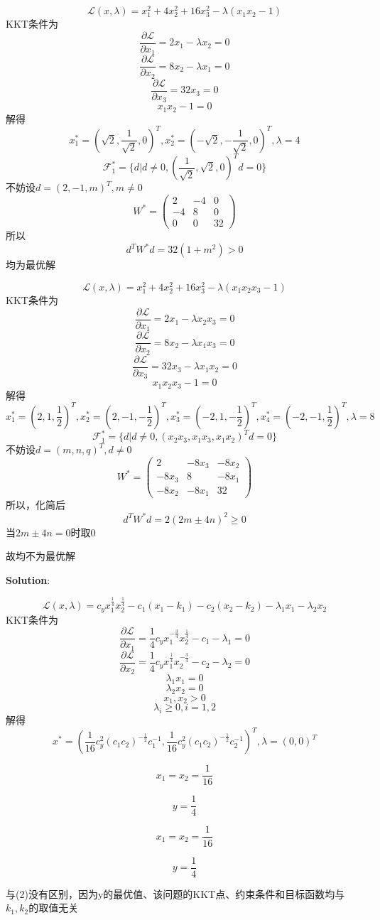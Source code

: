 \documentclass[a4 paper]{article}
\begin{document}

$$\mathcal{L}(x,\lambda) =x_1^2+4x_2^2+16x_3^2-\lambda(x_1 x_2-1)$$
KKT条件为
$$\frac{\partial \mathcal{L}}{\partial x_1}=2x_1-\lambda x_2=0$$
$$\frac{\partial \mathcal{L}}{\partial x_2}=8x_2-\lambda x_1=0$$
$$\frac{\partial \mathcal{L}}{\partial x_3}=32x_3=0$$
$$x_1x_2-1=0$$
解得
$$x_1^\ast=(\sqrt{2},\frac{1}{\sqrt{2}},0)^T,x_2^\ast=(-\sqrt{2},-\frac{1}{\sqrt{2}},0)^T,\lambda=4$$
$$\mathcal{F}_1^\ast=\{d|d\neq 0,(\frac{1}{\sqrt{2}},\sqrt{2},0)^Td=0\}$$
不妨设$d=(2,-1,m)^T,m\neq 0$
$$W^\ast=\begin{pmatrix}2& -4 & 0\\-4& 8 & 0\\0&0&32\end{pmatrix}$$
所以 $$ d^T W^\ast d=32(1+m^2)>0$$
均为最优解


$$\mathcal{L}(x,\lambda) =x_1^2+4x_2^2+16x_3^2-\lambda(x_1 x_2 x_3-1)$$
KKT条件为
$$\frac{\partial \mathcal{L}}{\partial x_1}=2x_1-\lambda x_2 x_3=0$$
$$\frac{\partial \mathcal{L}}{\partial x_2}=8x_2-\lambda x_1 x_3=0$$
$$\frac{\partial \mathcal{L}}{\partial x_3}=32x_3-\lambda x_1 x_2=0$$
$$x_1x_2x_3-1=0$$
解得
$$x_1^\ast=(2,1,\frac{1}{2})^T,x_2^\ast=(2,-1,-\frac{1}{2})^T,x_3^\ast=(-2,1,-\frac{1}{2})^T,x_4^\ast=(-2,-1,\frac{1}{2})^T,\lambda=8$$
$$\mathcal{F}_1^\ast=\{d|d\neq 0,(x_2 x_3,x_1x_3,x_1x_2)^Td=0\}$$
不妨设$d=(m,n,q)^T,d\neq 0$
$$W^\ast=\begin{pmatrix}2& -8x_3 & -8x_2\\-8x_3& 8 & -8x_1\\-8x_2&-8x_1&32\end{pmatrix}$$
所以，化简后 $$ d^T W^\ast d=2(2m\pm 4n)^2 \geqslant 0$$当$2m\pm4n=0$时取0

故均不为最优解

\textbf{Solution}:


$$\mathcal{L}(x,\lambda) =c_y x_1^{\frac{1}{4}} x_2^{\frac{1}{4}}-c_1(x_1-k_1)-c_2(x_2-k_2)-\lambda_1 x_1-\lambda_2 x_2$$
KKT条件为
$$\frac{\partial \mathcal{L}}{\partial x_1}=\frac{1}{4}c_y x_1^{-\frac{3}{4}}x_2^{\frac{1}{4}}-c_1-\lambda_1=0$$
$$\frac{\partial \mathcal{L}}{\partial x_2}=\frac{1}{4}c_y x_1^{\frac{1}{4}} x_2^{-\frac{3}{4}}-c_2-\lambda_2=0$$
$$\lambda_1x_1=0$$
$$\lambda_2x_2=0$$
$$x_1,x_2 >0$$
$$\lambda_i \geqslant 0, i=1,2$$
解得
$$x^\ast=(\frac{1}{16}c_y^2 (c_1c_2)^{-\frac{1}{2}}c_1^{-1},\frac{1}{16}c_y^2 (c_1c_2)^{-\frac{1}{2}}c_2^{-1})^T,\lambda=(0,0)^T$$


$$x_1=x_2=\frac{1}{16}$$

$$y=\frac{1}{4}$$


$$x_1=x_2=\frac{1}{16}$$

$$y=\frac{1}{4}$$

与(2)没有区别，因为y的最优值、该问题的KKT点、约束条件和目标函数均与$k_1,k_2$的取值无关
\end{document}
